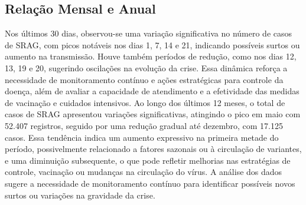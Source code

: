 \documentclass{article}%
\begin{document}
%
\subsection{Relação Mensal e Anual}%
\label{subsec:RelaoMensaleAnual}%
Nos últimos 30 dias, observou{-}se uma variação significativa no número de casos de SRAG, com picos notáveis nos dias 1, 7, 14 e 21, indicando possíveis surtos ou aumento na transmissão. Houve também períodos de redução, como nos dias 12, 13, 19 e 20, sugerindo oscilações na evolução da crise. Essa dinâmica reforça a necessidade de monitoramento contínuo e ações estratégicas para controle da doença, além de avaliar a capacidade de atendimento e a efetividade das medidas de vacinação e cuidados intensivos.\newline%
%
Ao longo dos últimos 12 meses, o total de casos de SRAG apresentou variações significativas, atingindo o pico em maio com 52.407 registros, seguido por uma redução gradual até dezembro, com 17.125 casos. Essa tendência indica um aumento expressivo na primeira metade do período, possivelmente relacionado a fatores sazonais ou à circulação de variantes, e uma diminuição subsequente, o que pode refletir melhorias nas estratégias de controle, vacinação ou mudanças na circulação do vírus. A análise dos dados sugere a necessidade de monitoramento contínuo para identificar possíveis novos surtos ou variações na gravidade da crise.\newline%
%
\end{document}
